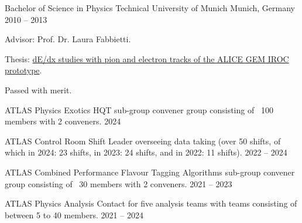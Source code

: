 \documentclass[11pt, letterpaper, draft]{academic-cv}
\begin{document}
\begin{cventries}
	\cventry
	  {Bachelor of Science in Physics} %
	  {Technical University of Munich} %
	  {Munich, Germany} %
	  {2010 -- 2013} %
	  {
		\begin{cvitems} %
		  \item {Advisor: Prof. Dr. Laura Fabbietti.}
		  \item {Thesis: \href{https://www.das.ktas.ph.tum.de/DasDocs/Public/Bachelor_Theses/thesis_Gadow.pdf}{dE/dx studies with pion and electron tracks of the ALICE GEM IROC prototype}.}
		  \item {Passed with merit.}
		\end{cvitems}
	  }
  \end{cventries}
  
\newpage




\begin{cvhonors}

  \cvhonor
    {ATLAS Physics Exotics HQT sub-group convener} %
    {group consisting of ~100 members with 2 conveners.} %
    {} %
    {2024} %

  \cvhonor
    {ATLAS Control Room Shift Leader} %
    {overseeing data taking (over 50 shifts, of which in 2024: 23 shifts, in 2023: 24 shifts, and in 2022: 11 shifts).} %
    {} %
    {2022 -- 2024} %

  \cvhonor
    {ATLAS Combined Performance Flavour Tagging Algorithms
    sub-group convener} %
    {group consisting of ~30 members with 2 conveners.} %
    {} %
    {2021 -- 2023} %

  \cvhonor
    {ATLAS Physics Analysis Contact} %
    {for five analysis teams with teams consisting of between 5 to 40 members.} %
    {} %
    {2021 -- 2024} %

\end{cvhonors}



\end{document}
